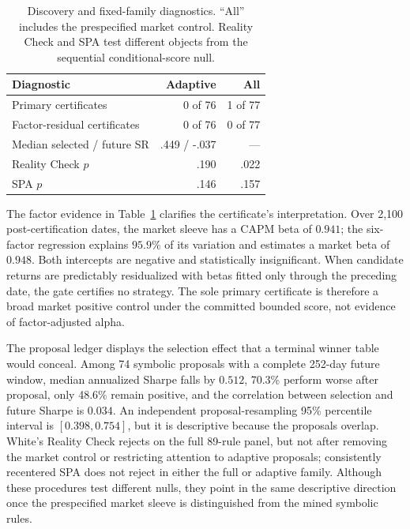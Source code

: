 \begin{table}[t]
\caption{Discovery and fixed-family diagnostics.  ``All'' includes the
prespecified market control.  Reality Check and SPA test different objects
from the sequential conditional-score null.}
\label{tab:diagnostics}
\centering
\small
\setlength{\tabcolsep}{2.8pt}
\begin{tabular}{lrr}
\toprule
Diagnostic & Adaptive & All\\
\midrule
Primary certificates & 0 of 76 & 1 of 77\\
Factor-residual certificates & 0 of 76 & 0 of 77\\
Median selected / future SR & .449 / -.037 & ---\\
Reality Check \(p\) & .190 & .022\\
SPA \(p\) & .146 & .157\\
\bottomrule
\end{tabular}
\end{table}

The factor evidence in Table~\ref{tab:diagnostics} clarifies the certificate's
interpretation.  Over 2,100 post-certification dates, the market sleeve has a
CAPM beta of \(0.941\); the six-factor regression explains \(95.9\%\) of its
variation and estimates a market beta of \(0.948\).  Both intercepts are
negative and statistically insignificant.  When candidate returns are
predictably residualized with betas fitted only through the preceding date,
the gate certifies no strategy.  The sole primary certificate is therefore a
broad market positive control under the committed bounded score, not evidence
of factor-adjusted alpha.

The proposal ledger displays the selection effect that a terminal winner
table would conceal.  Among 74 symbolic proposals with a complete 252-day
future window, median annualized Sharpe falls by \(0.512\), 70.3\% perform
worse after proposal, only 48.6\% remain positive, and the correlation between
selection and future Sharpe is \(0.034\).  An independent proposal-resampling
95\% percentile interval is \([0.398,0.754]\), but it is descriptive because
the proposals overlap.  White's Reality Check rejects on the full 89-rule
panel, but not
after removing the market control or restricting attention to adaptive
proposals; consistently recentered SPA does not reject in either the full or
adaptive family.  Although these procedures test different nulls, they point
in the same descriptive direction once the prespecified market sleeve is
distinguished from the mined symbolic rules.

